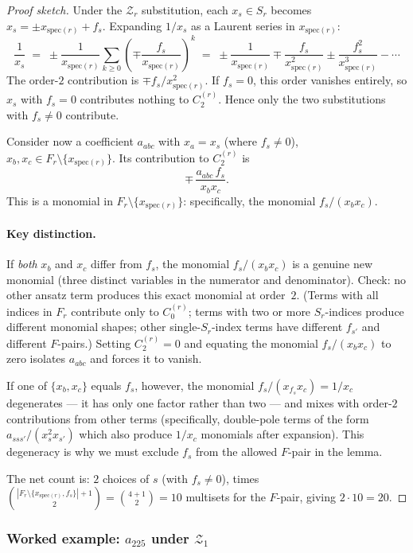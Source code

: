 \documentclass[11pt]{article}
\newcommand{\Z}{\mathcal{Z}}
\newcommand{\spec}{\mathrm{spec}}
\theoremstyle{definition}
\begin{document}
\begin{proof}[Proof sketch]
Under the $\Z_r$ substitution, each $x_s\in S_r$ becomes $x_s = \pm x_{\spec(r)}+f_s$.
Expanding $1/x_s$ as a Laurent series in $x_{\spec(r)}$:
\[
\frac{1}{x_s} \;=\; \pm\frac{1}{x_{\spec(r)}}
\sum_{k\ge 0}\left(\mp\frac{f_s}{x_{\spec(r)}}\right)^k
\;=\; \pm\frac{1}{x_{\spec(r)}} \mp \frac{f_s}{x_{\spec(r)}^2}
\pm \frac{f_s^2}{x_{\spec(r)}^3} - \cdots
\]
The order-$2$ contribution is $\mp f_s/x_{\spec(r)}^2$. If $f_s=0$, this
order vanishes entirely, so $x_s$ with $f_s=0$ contributes nothing to
$C_2^{(r)}$. Hence only the two substitutions with $f_s\neq 0$ contribute.

Consider now a coefficient $a_{abc}$ with $x_a=x_s$ (where $f_s\neq 0$),
$x_b,x_c\in F_r\setminus\{x_{\spec(r)}\}$. Its contribution to $C_2^{(r)}$
is
\[
\mp\,\frac{a_{abc}\,f_s}{x_b x_c}.
\]
This is a monomial in $F_r\setminus\{x_{\spec(r)}\}$: specifically, the
monomial $f_s/(x_b x_c)$.

\paragraph{Key distinction.} If \emph{both} $x_b$ and $x_c$ differ from
$f_s$, the monomial $f_s/(x_b x_c)$ is a genuine new monomial (three distinct
variables in the numerator and denominator). Check: no other ansatz term
produces this exact monomial at order~$2$. (Terms with all indices in $F_r$
contribute only to $C_0^{(r)}$; terms with two or more $S_r$-indices produce
different monomial shapes; other single-$S_r$-index terms have different $f_{s'}$ and
different $F$-pairs.) Setting $C_2^{(r)}=0$ and equating the monomial
$f_s/(x_b x_c)$ to zero isolates $a_{abc}$ and forces it to vanish.

If one of $\{x_b,x_c\}$ equals $f_s$, however, the monomial
$f_s/(x_{f_s} x_c)=1/x_c$ degenerates --- it has only one factor rather than
two --- and mixes with order-$2$ contributions from other terms (specifically,
double-pole terms of the form $a_{sss'}/(x_s^2 x_{s'})$ which also produce
$1/x_c$ monomials after expansion). This degeneracy is why we must exclude
$f_s$ from the allowed $F$-pair in the lemma.

The net count is: $2$ choices of $s$ (with $f_s\neq 0$), times
$\binom{|F_r\setminus\{x_{\spec(r)},f_s\}|+1}{2}=\binom{4+1}{2}=10$ multisets
for the $F$-pair, giving $2\cdot 10=20$.
\end{proof}

\subsubsection*{Worked example: $a_{225}$ under $\Z_1$}
\end{document}
